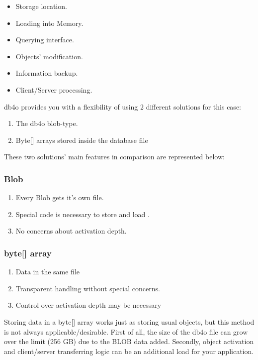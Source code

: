 \begin{itemize}
\item Storage location.
\item Loading into Memory.
\item Querying interface.
\item Objects' modification.
\item Information backup.
\item Client/Server processing.
\end{itemize}

db4o provides you with a flexibility of using 2 different solutions for this case:

\begin{enumerate}
\item The db4o blob-type.
\item Byte[] arrays stored inside the database file
\end{enumerate}

These two solutions' main features in comparison are represented below:

\subsubsection*{Blob}

\begin{enumerate}
\item Every Blob gets it's own file.
\item Special code is necessary to store and load .
\item No concerns about activation depth.
\end{enumerate}

\subsubsection*{byte[] array}

\begin{enumerate}
\item Data in the same file
\item Transparent handling without special concerns.
\item Control over activation depth may be necessary
\end{enumerate}

Storing data in a byte[] array works just as storing usual objects, but this method is not always applicable/desirable. First of all, the size of the db4o file can grow over the limit (256 GB) due to the BLOB data added. Secondly, object activation and client/server transferring logic can be an additional load for your application.

